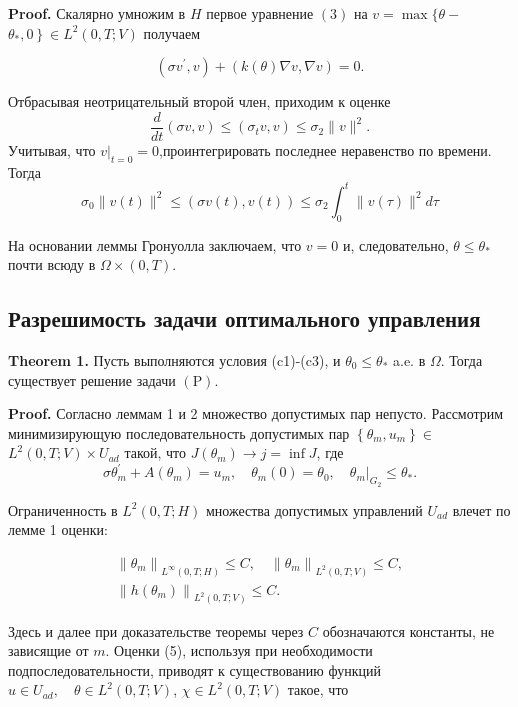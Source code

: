 \textbf{Proof.}
Скалярно умножим в $H$ первое уравнение $(3)$ на
$v=\max \{\theta-$ $\left.\theta_{*}, 0\right\} \in L^{2}(0, T ; V)$ получаем

\[ \left(\sigma v^{\prime}, v\right)+(k(\theta) \nabla v, \nabla v)=0. \]

Отбрасывая неотрицательный второй член, приходим к оценке
\[ \frac{d}{d t}(\sigma v, v) \leq\left(\sigma_{t} v, v\right) \leq \sigma_{2}\|v\|^{2} . \]
Учитывая, что $\left.v\right|_{t=0}=0$,проинтегрировать последнее неравенство по времени.
Тогда
\[ \sigma_{0}\|v(t)\|^{2} \leq(\sigma v(t), v(t)) \leq \sigma_{2} \int_{0}^{t}\|v(\tau)\|^{2} d \tau \]

На основании леммы Гронуолла заключаем,
что $v=0$ и, следовательно, $\theta \leq \theta_{*}$ почти всюду в $\Omega\times(0,T)$.

\subsection{Разрешимость задачи оптимального управления}
\label{subsec:ch3:sec2:subsec5}

\textbf{Theorem 1.}
Пусть выполняются условия (c1)-(c3), и $\theta_{0} \leq \theta_{*}$ a.e. в $\Omega$.
Тогда существует решение задачи $(\mathrm{P})$.

\textbf{Proof.}
Согласно леммам 1 и 2 множество допустимых пар непусто.
Рассмотрим минимизирующую последовательность допустимых
пар $\left\{\theta_{m}, u_{m}\right\} \in$ $L^{2}(0, T ; V) \times U_{a d}$
такой, что $J\left(\theta_{m}\right) \rightarrow j=\inf J$, где
\[
    \sigma \theta_{m}^{\prime}+A\left(\theta_{m}\right)=u_{m},
    \quad \theta_{m}(0)=\theta_{0},\left.\quad \theta_{m}\right|_{G_{2}} \leq \theta_{*} .
\]

Ограниченность в $L^{2}(0, T ; H)$ множества допустимых управлений $U_{a d}$ влечет по лемме 1 оценки:

\[
    \begin{gathered}
        \left\|\theta_{m}\right\|_{L^{\infty}(0, T ; H)} \leq C,
        \quad\left\|\theta_{m}\right\|_{L^{2}(0, T ; V)} \leq C, \\
        \left\|h\left(\theta_{m}\right)\right\|_{L^{2}(0, T ; V)} \leq C.
    \end{gathered}
\]

Здесь и далее при доказательстве теоремы через $C$ обозначаются константы, не зависящие от $m$.
Оценки (5), используя при необходимости подпоследовательности,
приводят к существованию функций
$u \in U_{a d}, \quad \theta \in L^{2}(0, T ; V)$, $\chi  \in L^{2}(0, T; V)$
такое, что

